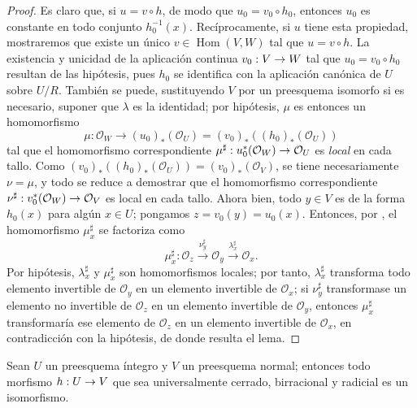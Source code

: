 \documentclass[oneside,10pt]{amsart}
\makeatletter
\newcommand{\ega@arrow}[2]{\mathchoice{#1}{#2}{#2}{#2}}
\renewcommand{\to}{\ega@arrow{\longrightarrow}{\rightarrow}}
\let\EGAOriginalLabel\label
\renewcommand{\label}[1]{\phantomsection\EGAOriginalLabel{#1}}
\makeatother
\begin{document}
\begin{proof}
Es claro que, si $u=v\circ h$, de modo que $u_0=v_0\circ h_0$, entonces $u_0$ es constante en todo conjunto $h_0^{-1}(x)$.
Recíprocamente, si $u$ tiene esta propiedad, mostraremos que existe un único $v\in\operatorname{Hom}(V,W)$ tal que $u=v\circ h$.
La existencia y unicidad de la aplicación continua $v_0:V\to W$ tal que $u_0=v_0\circ h_0$ resultan de las hipótesis, pues $h_0$ se identifica con la aplicación canónica de $U$ sobre $U/R$.
También se puede, sustituyendo $V$ por un preesquema isomorfo si es necesario, suponer que $\lambda$ es la identidad;
por hipótesis, $\mu$ es entonces un homomorfismo
\[
  \mu:\mathcal{O}_W\longrightarrow(u_0)_*(\mathcal{O}_U)
  =(v_0)_*((h_0)_*(\mathcal{O}_U))
\]
tal que el homomorfismo correspondiente $\mu^\sharp:u_0^*(\mathcal{O}_W)\to\mathcal{O}_U$ es \emph{local} en cada tallo.
Como $(v_0)_*((h_0)_*(\mathcal{O}_U))=(v_0)_*(\mathcal{O}_V)$, se tiene necesariamente $\nu=\mu$, y todo se reduce a demostrar que el homomorfismo correspondiente $\nu^\sharp:v_0^*(\mathcal{O}_W)\to\mathcal{O}_V$ es local en cada tallo.
Ahora bien, todo $y\in V$ es de la forma $h_0(x)$ para algún $x\in U$;
pongamos $z=v_0(y)=u_0(x)$.
Entonces, por , el homomorfismo $\mu_x^\sharp$ se factoriza como
\[
  \mu_x^\sharp:\mathcal{O}_z
  \xrightarrow{\nu_y^\sharp}\mathcal{O}_y
  \xrightarrow{\lambda_x^\sharp}\mathcal{O}_x.
\]
Por hipótesis, $\lambda_x^\sharp$ y $\mu_x^\sharp$ son homomorfismos locales;
por tanto, $\lambda_x^\sharp$ transforma todo elemento invertible de $\mathcal{O}_y$ en un elemento invertible de $\mathcal{O}_x$;
si $\nu_y^\sharp$ transformase un elemento no invertible de $\mathcal{O}_z$ en un elemento invertible de $\mathcal{O}_y$, entonces $\mu_x^\sharp$ transformaría ese elemento de $\mathcal{O}_z$ en un elemento invertible de $\mathcal{O}_x$, en contradicción con la hipótesis, de donde resulta el lema.
\end{proof}

\begin{corollary}[8.11.2]
\label{II.8.11.2-fr}
Sean $U$ un preesquema íntegro y $V$ un preesquema normal;
entonces todo morfismo $h:U\to V$ que sea universalmente cerrado, birracional y radicial es un isomorfismo.
\end{corollary}
\end{document}
